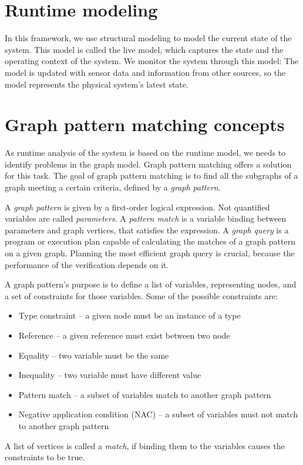 \section{Runtime modeling}

In this framework, we use structural modeling to model the current state of the system. 
This model is called the live model, which captures the state and the operating context of the system. 
We monitor the system through this model: 
The model is updated with sensor data and information from other sources, so the model represents the physical system's latest state. 

\section{Graph pattern matching concepts}

As runtime analysis of the system is based on the runtime model, we needs to identify problems in the graph model. 
Graph pattern matching offers a solution for this task. 
The goal of graph pattern matching is to find all the subgraphs of a graph meeting a certain criteria, defined by a \emph{graph pattern}.

A \emph{graph pattern} is given by a first-order logical expression. 
Not quantified variables are called \emph{parameters}.  
A \emph{pattern match} is a variable binding between parameters and graph vertices, that satisfies the expression.
A \emph{graph query} is a program or execution plan capable of calculating the matches of a graph pattern on a given graph. 
Planning the most efficient graph query is crucial, because the performance of the verification depends on it.



A graph pattern's purpose is to define a list of variables, representing nodes, and a set of constraints for those variables. Some of the possible constraints are:

\begin{itemize}
	\item Type constraint -- a given node must be an instance of a type
	\item Reference -- a given reference must exist between two node
	\item Equality -- two variable must be the same
	\item Inequality -- two variable must have different value
	\item Pattern match -- a subset of variables match to another graph pattern
	\item Negative application condition (NAC) -- a subset of variables must not match to another graph pattern
\end{itemize}
A list of vertices is called a \emph{match}, if binding them to the variables causes the constraints to be true.


